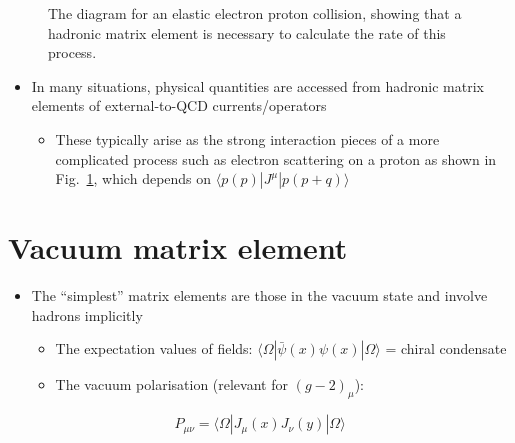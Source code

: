 \newpage
\begin{figure}
    \centering
    \caption{The diagram for an elastic electron proton collision, showing that a hadronic matrix element is necessary to calculate the rate of this process.}
    \label{fig:ep_scatter}
\end{figure}
\begin{itemize}
  \item In many situations, physical quantities are accessed from hadronic matrix elements of external-to-QCD currents/operators
  \begin{itemize}
      \item These typically arise as the strong interaction pieces of a more complicated process such as electron scattering on a proton as shown in Fig.~\ref{fig:ep_scatter}, which depends on $\langle p(p)| J^\mu | p(p + q)\rangle$
  \end{itemize}
\end{itemize}


\section{Vacuum matrix element}
\begin{itemize}
    \item The ``simplest'' matrix elements are those in the vacuum state and involve hadrons implicitly
    \begin{itemize}
        \item The expectation values of fields: $\langle \Omega | \bar{\psi}(x) \psi(x) | \Omega \rangle$ = chiral condensate
        \item The vacuum polarisation (relevant for $(g-2)_\mu$):
    \end{itemize}
\end{itemize}
\begin{equation}
    P_{\mu \nu} = \langle \Omega | J_\mu(x) J_\nu(y) | \Omega \rangle
\end{equation}


